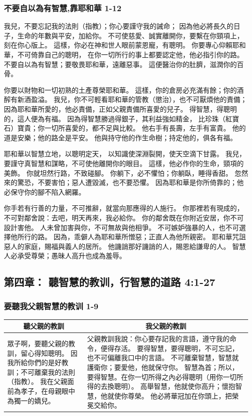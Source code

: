 \subsubsection{不要自以為有智慧,靠耶和華 1-12}
我兒，不要忘記我的法則（指教）；你心要謹守我的誡命；
因為他必將長久的日子，生命的年數與平安，加給你。
不可使慈愛、誠實離開你，要繫在你頸項上，刻在你心版上。
這樣，你必在神和世人眼前蒙恩寵，有聰明。
你要專心仰賴耶和華，不可倚靠自己的聰明，
在你一切所行的事上都要認定他，他必指引你的路。
不要自以為有智慧；要敬畏耶和華，遠離惡事。
這便醫治你的肚臍，滋潤你的百骨。


你要以財物和一切初熟的土產尊榮耶和華。
這樣，你的倉房必充滿有餘；你的酒醡有新酒盈溢。
我兒，你不可輕看耶和華的管教（懲治），也不可厭煩他的責備；
因為耶和華所愛的，他必責備，正如父親責備所喜愛的兒子。
得智慧，得聰明的，這人便為有福。
因為得智慧勝過得銀子，其利益強如精金，
比珍珠（紅寶石）寶貴；你一切所喜愛的，都不足與比較。
他右手有長壽，左手有富貴。
他的道是安樂；他的路全是平安。
他與持守他的作生命樹；持定他的，俱各有福。

耶和華以智慧立地，以聰明定天，
以知識使深淵裂開，使天空滴下甘露。
我兒，要謹守真智慧和謀略，不可使他離開你的眼目。
這樣，他必作你的生命，頸項的美飾。
你就坦然行路，不致碰腳。
你躺下，必不懼怕；你躺臥，睡得香甜。
忽然來的驚恐，不要害怕；惡人遭毀滅，也不要恐懼。
因為耶和華是你所倚靠的；他必保守你的腳不陷入網羅。

你手若有行善的力量，不可推辭，就當向那應得的人施行。
你那裡若有現成的，不可對鄰舍說：去吧，明天再來，我必給你。
你的鄰舍既在你附近安居，你不可設計害他。
人未曾加害與你，不可無故與他相爭。
不可嫉妒強暴的人，也不可選擇他所行的路。
因為，乖僻人為耶和華所憎惡；正直人為他所親密。
耶和華咒詛惡人的家庭，賜福與義人的居所。
他譏誚那好譏誚的人，賜恩給謙卑的人。
智慧人必承受尊榮；愚昧人高升也成為羞辱。

\subsection{第四章：  聽智慧的教训，行智慧的道路 4:1-27}

\subsubsection{要聽我父親智慧的教训 1-9}
\begin{table}[H]
\centering
\begin{tabular}{p{}|p{12.00cm}}\hline\hline
\multicolumn{1}{c|}{聽父親的教訓}&\multicolumn{1}{c}{我父親的教訓}\\\hline
眾子啊，要聽父親的教訓，留心得知聰明。
因我所給你們的是好教訓；不可離棄我的法則（指教）。
我在父親面前為孝子，在母親眼中為獨一的嬌兒。
&父親教訓我說：你心要存記我的言語，遵守我的命令，便得存活。
要得智慧，要得聰明，不可忘記，也不可偏離我口中的言語。
不可離棄智慧，智慧就護衛你；要愛他，他就保守你。
智慧為首；所以，要得智慧。在你一切所得之內必得聰明（用你一切所得的去換聰明）。
高舉智慧，他就使你高升；懷抱智慧，他就使你尊榮。
他必將華冠加在你頭上，把榮冕交給你。\\\hline
\end{tabular}
\end{table} 


